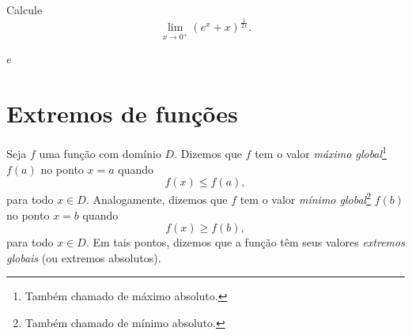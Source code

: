 \begin{exer}
  Calcule
  \begin{equation}
    \lim_{x\to 0^+} \left(e^x + x\right)^{\frac{1}{2x}}.
  \end{equation}
\end{exer}
\begin{resp}
  $e$
\end{resp}

\section{Extremos de funções}\label{cap_apderiv_sec_extfun}

Seja $f$ uma função com domínio $D$. Dizemos que $f$ tem o valor \emph{máximo global}\footnote{Também chamado de máximo absoluto.} $f(a)$ no ponto $x=a$ quando
\begin{equation}
  f(x) \leq f(a),
\end{equation}
para todo $x\in D$. Analogamente, dizemos que $f$ tem o valor \emph{mínimo global}\footnote{Também chamado de mínimo absoluto.} $f(b)$ no ponto $x=b$ quando
\begin{equation}
  f(x) \geq f(b),
\end{equation}
para todo $x\in D$. Em tais pontos, dizemos que a função têm seus valores \emph{extremos globais} (ou extremos absolutos).

